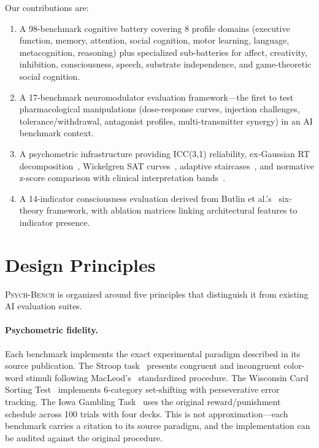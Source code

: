 \documentclass[11pt,letterpaper]{article}
\newcommand{\psychbench}{\textsc{Psych-Bench}}
\begin{document}
Our contributions are:
\begin{enumerate}[nosep]
    \item A 98-benchmark cognitive battery covering 8 profile domains (executive function, memory, attention, social cognition, motor learning, language, metacognition, reasoning) plus specialized sub-batteries for affect, creativity, inhibition, consciousness, speech, substrate independence, and game-theoretic social cognition.
    \item A 17-benchmark neuromodulator evaluation framework---the first to test pharmacological manipulations (dose-response curves, injection challenges, tolerance/withdrawal, antagonist profiles, multi-transmitter synergy) in an AI benchmark context.
    \item A psychometric infrastructure providing ICC(3,1) reliability, ex-Gaussian RT decomposition~\citep{heathcote1996fitting}, Wickelgren SAT curves~\citep{wickelgren1977speed}, adaptive staircases~\citep{levitt1971transformed}, and normative z-score comparison with clinical interpretation bands~\citep{cicchetti1994guidelines}.
    \item A 14-indicator consciousness evaluation derived from Butlin et al.'s~\citep{butlin2023consciousness} six-theory framework, with ablation matrices linking architectural features to indicator presence.
\end{enumerate}

\section{Design Principles}
\label{sec:principles}

\psychbench{} is organized around five principles that distinguish it from existing AI evaluation suites.

\paragraph{Psychometric fidelity.} Each benchmark implements the exact experimental paradigm described in its source publication. The Stroop task~\citep{stroop1935interference} presents congruent and incongruent color-word stimuli following MacLeod's~\citep{macleod1991half} standardized procedure. The Wisconsin Card Sorting Test~\citep{berg1948simple} implements 6-category set-shifting with perseverative error tracking. The Iowa Gambling Task~\citep{bechara1994insensitivity} uses the original reward/punishment schedule across 100 trials with four decks. This is not approximation---each benchmark carries a citation to its source paradigm, and the implementation can be audited against the original procedure.
\end{document}
